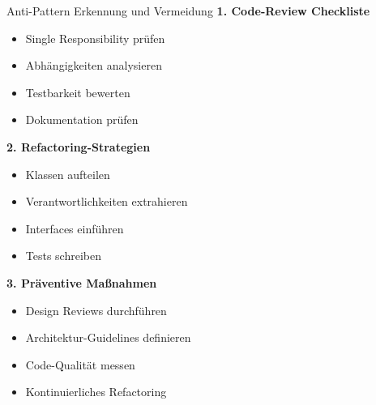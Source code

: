 \begin{KR}{Anti-Pattern Erkennung und Vermeidung}
\textbf{1. Code-Review Checkliste}
\begin{itemize}
    \item Single Responsibility prüfen
    \item Abhängigkeiten analysieren
    \item Testbarkeit bewerten
    \item Dokumentation prüfen
\end{itemize}

\textbf{2. Refactoring-Strategien}
\begin{itemize}
    \item Klassen aufteilen
    \item Verantwortlichkeiten extrahieren
    \item Interfaces einführen
    \item Tests schreiben
\end{itemize}

\textbf{3. Präventive Maßnahmen}
\begin{itemize}
    \item Design Reviews durchführen
    \item Architektur-Guidelines definieren
    \item Code-Qualität messen
    \item Kontinuierliches Refactoring
\end{itemize}
\end{KR}


